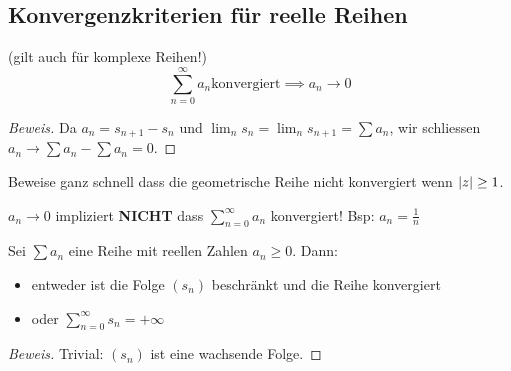 \subsection{Konvergenzkriterien für reelle Reihen}
\begin{Bem} (gilt auch für komplexe Reihen!)
  \[\sum^\infty_{n=0}a_n \text{konvergiert}\implies a_n\to 0\]
\end{Bem}
\begin{proof}[Beweis] Da $a_n = s_{n+1}- s_n$
und $\lim_n s_n = \lim_n s_{n+1} = \sum a_n$, wir schliessen
$a_n\to \sum a_n - \sum a_n = 0$.
\end{proof}
\begin{Ueb} Beweise
ganz schnell dass die geometrische Reihe nicht konvergiert wenn $\mathopen| z \mathclose|\geq 1$.
\end{Ueb}
\begin{Bem}
  $a_n\to 0$ impliziert {\bf NICHT}
dass $\sum^\infty_{n=0}a_n$ konvergiert! Bsp: $a_n=\frac{1}{n}$
\end{Bem}

\begin{Sat}
  Sei $\sum a_n$ eine Reihe mit reellen Zahlen $a_n\geq 0$. Dann:
  \begin{itemize}
    \item entweder ist die Folge $(s_n)$ beschränkt und die Reihe konvergiert
    \item oder $\sum^\infty_{n=0}s_n=+\infty$
  \end{itemize}
\end{Sat}

\begin{proof}[Beweis] Trivial: $(s_n)$ ist eine wachsende Folge.
\end{proof}

